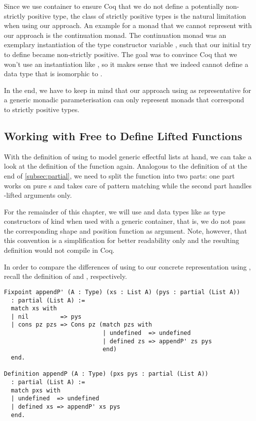 Since we use container to ensure Coq that we do not define a potentially non\--strictly positive type, the class of strictly positive types is the natural limitation when using our approach.
An example for a monad that we cannot represent with our approach is the continuation monad.
The continuation monad  was an exemplary instantiation of the type constructor variable , such that our initial try to define  became non\--strictly positive.
The goal was to convince Coq that we won't use an instantiation like , so it makes sense that we indeed cannot define a data type that is isomorphic to .

In the end, we have to keep in mind that our approach using  as representative for a generic monadic parameterisation can only represent monads that correspond to strictly positive types.

\subsection{Working with Free to Define Lifted Functions}
\label{subsec:liftedFunctions}

With the definition of  using  to model generic effectful lists at hand, we can take a look at the definition of the function  again.
Analogous to the definition of  at the end of \autoref{subsec:partial}, we need to split the function into two parts: one part works on pure s and takes care of pattern matching while the second part handles \--lifted arguments only.

For the remainder of this chapter, we will use  and data types like  as type constructors of kind  when used with a generic container, that is, we do not pass the corresponding shape and position function as argument.
Note, however, that this convention is a simplification for better readability only and the resulting definition would not compile in Coq.

In order to compare the differences of using  to our concrete representation using , recall the definition of  and , respectively.

\begin{verbatim}
Fixpoint appendP' (A : Type) (xs : List A) (pys : partial (List A))
  : partial (List A) :=
  match xs with
  | nil         => pys
  | cons pz pzs => Cons pz (match pzs with
                            | undefined  => undefined
                            | defined zs => appendP' zs pys
                            end)
  end.

Definition appendP (A : Type) (pxs pys : partial (List A))
  : partial (List A) :=
  match pxs with
  | undefined  => undefined
  | defined xs => appendP' xs pys
  end.
\end{verbatim}

